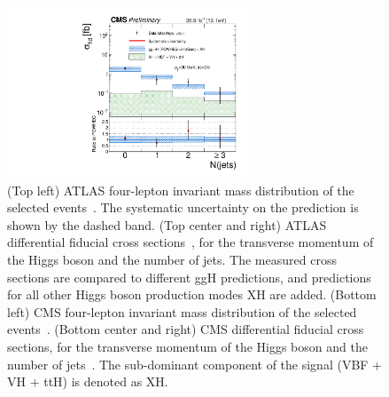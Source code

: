 \documentclass[10pt]{article}
\begin{document}
\begin{figure}[htb]
\includegraphics[height=2in]{figures/CMS-HIG-16-041__Figure_009-c__njets.pdf}
\caption{
  (Top left) ATLAS four-lepton invariant mass distribution of the selected
  events~\cite{ATLAS-ZZ}. The systematic uncertainty on the prediction is shown
  by the dashed band. (Top center and right) ATLAS differential fiducial cross
  sections~\cite{ATLAS-ZZ}, for the transverse momentum of the Higgs boson and
  the number of jets.
  The measured cross sections are compared to different ggH predictions, and
  predictions for all other Higgs boson production modes XH are added.
  (Bottom left) CMS four-lepton invariant mass distribution of the selected
  events~\cite{CMS:2017jkd}.
  (Bottom center and right) CMS differential fiducial cross sections, for the
  transverse momentum of the Higgs boson and the number of jets~\cite{CMS:2017jkd}.
  The sub-dominant component of the signal (VBF + VH + ttH) is denoted as XH.
}
\label{fig:figure-ZZ}
\end{figure}
\end{document}
